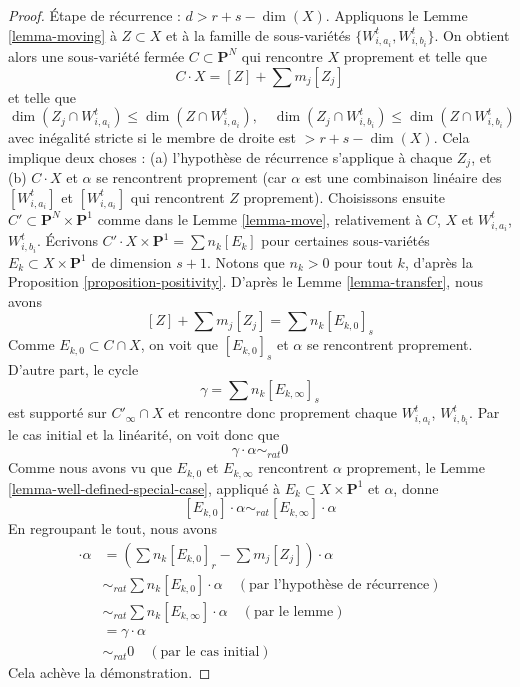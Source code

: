 \begin{proof}
\medskip\noindent
Étape de récurrence : $d >  r + s - \dim(X)$. Appliquons le
Lemme \ref{lemma-moving} à $Z \subset X$ et à
la famille de sous-variétés $\{W_{i, a_i}^t, W_{i, b_i}^t\}$. On obtient alors une
sous-variété fermée $C \subset \mathbf{P}^N$ qui rencontre $X$
proprement et telle que
$$
C \cdot X = [Z] + \sum m_j [Z_j]
$$
et telle que
$$
\dim(Z_j \cap W_{i, a_i}^t) \leq \dim(Z \cap W_{i, a_i}^t),\quad
\dim(Z_j \cap W_{i, b_i}^t) \leq \dim(Z \cap W_{i, b_i}^t)
$$
avec inégalité stricte si le membre de droite est $> r + s - \dim(X)$.
Cela implique deux choses : (a) l'hypothèse de récurrence s'applique à
chaque $Z_j$, et (b) $C \cdot X$ et $\alpha$ se rencontrent proprement (car
$\alpha$ est une combinaison linéaire des $[W_{i, a_i}^t]$ et
$[W_{i, a_i}^t]$ qui rencontrent $Z$ proprement).
Choisissons ensuite $C' \subset \mathbf{P}^N \times \mathbf{P}^1$
comme dans le Lemme \ref{lemma-move}, relativement à $C$, $X$ et
$W_{i, a_i}^t$, $W_{i, b_i}^t$.
Écrivons $C' \cdot X \times \mathbf{P}^1 = \sum n_k [E_k]$ pour
certaines sous-variétés $E_k \subset X \times \mathbf{P}^1$ de
dimension $s + 1$. Notons que $n_k > 0$ pour tout $k$, d'après la
Proposition \ref{proposition-positivity}.
D'après le Lemme \ref{lemma-transfer}, nous avons
$$
[Z] + \sum m_j [Z_j] = \sum n_k[E_{k, 0}]_s
$$
Comme $E_{k, 0} \subset C \cap X$, on voit que $[E_{k, 0}]_s$ et $\alpha$
se rencontrent proprement. D'autre part, le cycle
$$
\gamma = \sum n_k[E_{k, \infty}]_s
$$
est supporté sur $C'_\infty \cap X$ et
rencontre donc proprement chaque $W_{i, a_i}^t$, $W_{i, b_i}^t$.
Par le cas initial et la linéarité, on voit donc que
$$
\gamma \cdot \alpha \sim_{rat} 0
$$
Comme nous avons vu que $E_{k, 0}$ et $E_{k, \infty}$
rencontrent $\alpha$ proprement, le Lemme \ref{lemma-well-defined-special-case},
appliqué à $E_k \subset X \times \mathbf{P}^1$ et $\alpha$, donne
$$
[E_{k, 0}] \cdot \alpha \sim_{rat} [E_{k, \infty}] \cdot \alpha
$$
En regroupant le tout, nous avons
\begin{align*}
[Z] \cdot \alpha
& =
(\sum n_k[E_{k, 0}]_r - \sum m_j[Z_j]) \cdot \alpha \\
& \sim_{rat}
\sum n_k [E_{k, 0}] \cdot \alpha \quad (\text{par l'hypothèse de récurrence})\\
& \sim_{rat}
\sum n_k [E_{k, \infty}] \cdot \alpha \quad (\text{par le lemme})\\
& =
\gamma \cdot \alpha \\
& \sim_{rat}
0 \quad (\text{par le cas initial})
\end{align*}
Cela achève la démonstration.
\end{proof}

